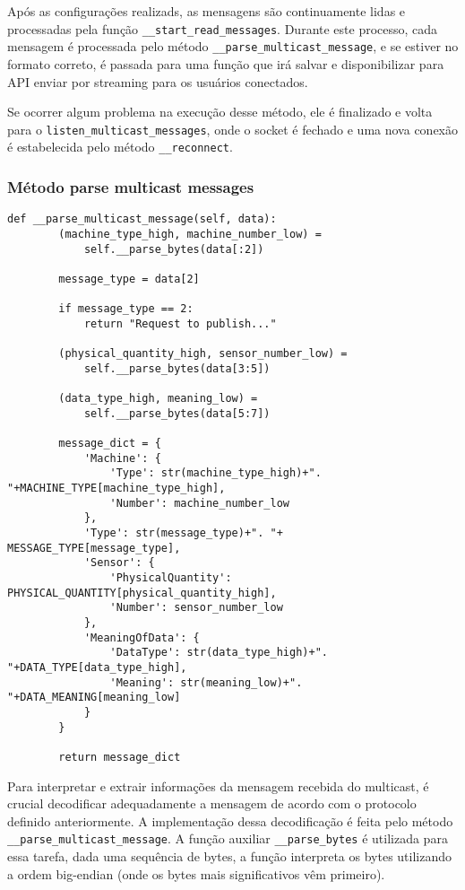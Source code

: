 Após as configurações realizads, as mensagens são continuamente lidas e processadas pela função \texttt{\_\_start\_read\_messages}. Durante este processo, cada mensagem é processada pelo método \texttt{\_\_parse\_multicast\_message}, e se estiver no formato correto, é passada para uma função que irá salvar e disponibilizar para API enviar por streaming para os usuários conectados.

Se ocorrer algum problema na execução desse método, ele é finalizado e volta para o \texttt{listen\_multicast\_messages}, onde o socket é fechado e uma nova conexão é estabelecida pelo método \texttt{\_\_reconnect}.


\subsubsection[Método parse multicast messages]{Método parse multicast messages}


\begin{verbatim}
def __parse_multicast_message(self, data):
        (machine_type_high, machine_number_low) = 
            self.__parse_bytes(data[:2])

        message_type = data[2]

        if message_type == 2:
            return "Request to publish..."

        (physical_quantity_high, sensor_number_low) = 
            self.__parse_bytes(data[3:5])
        
        (data_type_high, meaning_low) = 
            self.__parse_bytes(data[5:7])

        message_dict = {
            'Machine': {
                'Type': str(machine_type_high)+". "+MACHINE_TYPE[machine_type_high],
                'Number': machine_number_low
            },
            'Type': str(message_type)+". "+ MESSAGE_TYPE[message_type],
            'Sensor': {
                'PhysicalQuantity': PHYSICAL_QUANTITY[physical_quantity_high],
                'Number': sensor_number_low
            },
            'MeaningOfData': {
                'DataType': str(data_type_high)+". "+DATA_TYPE[data_type_high],
                'Meaning': str(meaning_low)+". "+DATA_MEANING[meaning_low]
            }
        }

        return message_dict
    \end{verbatim}



Para interpretar e extrair informações da mensagem recebida do multicast, é crucial decodificar adequadamente a mensagem de acordo com o protocolo definido anteriormente. A implementação dessa decodificação é feita pelo método \texttt{\_\_parse\_multicast\_message}. A função auxiliar \texttt{\_\_parse\_bytes} é utilizada para essa tarefa, dada uma sequência de bytes, a função interpreta os bytes utilizando a ordem big-endian (onde os bytes mais significativos vêm primeiro).

